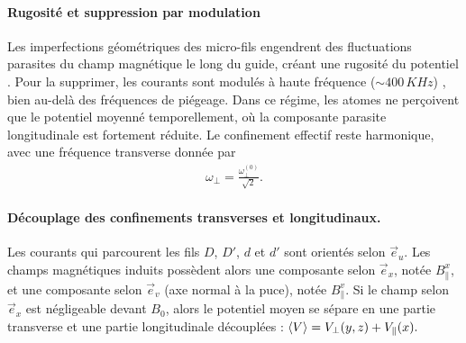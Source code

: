 \paragraph{Rugosité et suppression par modulation}
Les imperfections géométriques des micro-fils engendrent des fluctuations parasites du champ magnétique le long du guide, créant une rugosité du potentiel \cite{SKraft_2002,PhysRevA.70.043629}. Pour la supprimer, les courants sont modulés à haute fréquence ($\sim 400\,KHz$) \cite{PhysRevLett.98.263201,jacqm2012}, bien au-delà des fréquences de piégeage. Dans ce régime, les atomes ne perçoivent que le potentiel moyenné temporellement, où la composante parasite longitudinale est fortement réduite. Le confinement effectif reste harmonique, avec une fréquence transverse donnée par
\begin{eqnarray}\label{chap5:eq.pot.perp.1}
	\omega_\perp = \frac{\omega_\perp^{(0)}}{\sqrt{2}}.		
\end{eqnarray}




\paragraph{Découplage des confinements transverses et longitudinaux.}
Les courants qui parcourent les fils $D$, $D'$, $d$ et $d'$ sont orientés selon $\vec{e}_u$. 
Les champs magnétiques induits possèdent alors une composante selon $\vec{e}_x$, notée $B_\parallel^x$, et une composante selon $\vec{e}_v$ (axe normal à la puce), notée $B_\parallel^v$. 
Si le champ selon $\vec{e}_x$ est négligeable devant $B_0$, alors le potentiel moyen se sépare en une partie transverse et une partie longitudinale découplées : 
\(
\braket{V} = V_\perp(y,z) + V_\parallel(x) .
\)



